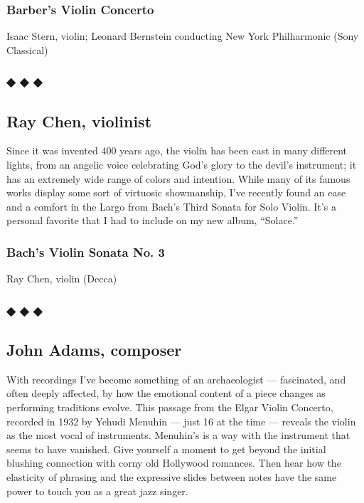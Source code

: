 \hypertarget{barbers-violin-concerto}{%
\subsubsection{Barber's Violin Concerto}\label{barbers-violin-concerto}}

Isaac Stern, violin; Leonard Bernstein conducting New York Philharmonic
(Sony Classical)

\hypertarget{---12}{%
\subsubsection{◆ ◆ ◆}\label{---12}}

\hypertarget{ray-chen-violinist}{%
\subsection{Ray Chen, violinist}\label{ray-chen-violinist}}

Since it was invented 400 years ago, the violin has been cast in many
different lights, from an angelic voice celebrating God's glory to the
devil's instrument; it has an extremely wide range of colors and
intention. While many of its famous works display some sort of virtuosic
showmanship, I've recently found an ease and a comfort in the Largo from
Bach's Third Sonata for Solo Violin. It's a personal favorite that I had
to include on my new album, ``Solace.''

\hypertarget{bachs-violin-sonata-no-3}{%
\subsubsection{Bach's Violin Sonata No.
3}\label{bachs-violin-sonata-no-3}}

Ray Chen, violin (Decca)

\hypertarget{---13}{%
\subsubsection{◆ ◆ ◆}\label{---13}}

\hypertarget{john-adams-composer}{%
\subsection{John Adams, composer}\label{john-adams-composer}}

With recordings I've become something of an archaeologist ---
fascinated, and often deeply affected, by how the emotional content of a
piece changes as performing traditions evolve. This passage from the
Elgar Violin Concerto, recorded in 1932 by Yehudi Menuhin --- just 16 at
the time --- reveals the violin as the most vocal of instruments.
Menuhin's is a way with the instrument that seems to have vanished. Give
yourself a moment to get beyond the initial blushing connection with
corny old Hollywood romances. Then hear how the elasticity of phrasing
and the expressive slides between notes have the same power to touch you
as a great jazz singer.

